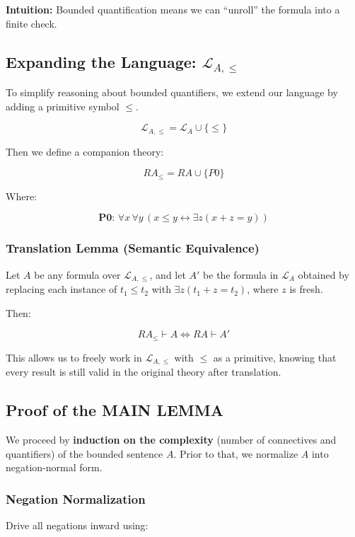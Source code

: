 \documentclass[12pt]{article}
\begin{document}
\textbf{Intuition:} Bounded quantification means we can “unroll” the formula into a finite check.

\subsection{Expanding the Language: \( \mathcal{L}_{A,\leq} \)}

To simplify reasoning about bounded quantifiers, we extend our language by adding a primitive symbol \( \leq \).

\[
\mathcal{L}_{A,\leq} = \mathcal{L}_A \cup \{ \leq \}
\]

Then we define a companion theory:

\[
RA_\leq = RA \cup \{ P0 \}
\]

Where:

\[
\textbf{P0: } \forall x\, \forall y\, (x \leq y \leftrightarrow \exists z(x + z = y))
\]

\subsubsection*{Translation Lemma (Semantic Equivalence)}

Let \( A \) be any formula over \( \mathcal{L}_{A,\leq} \), and let \( A' \) be the formula in \( \mathcal{L}_A \) obtained by replacing each instance of \( t_1 \leq t_2 \) with \( \exists z(t_1 + z = t_2) \), where \( z \) is fresh.

Then:

\[
RA_\leq \vdash A \iff RA \vdash A'
\]

This allows us to freely work in \( \mathcal{L}_{A,\leq} \) with \( \leq \) as a primitive, knowing that every result is still valid in the original theory after translation.

\subsection{Proof of the MAIN LEMMA}

We proceed by \textbf{induction on the complexity} (number of connectives and quantifiers) of the bounded sentence \( A \). Prior to that, we normalize \( A \) into negation-normal form.

\subsubsection*{Negation Normalization}

Drive all negations inward using:
\end{document}
